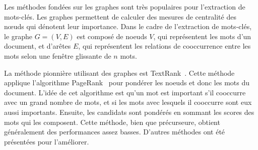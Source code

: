 Les méthodes fondées sur les graphes sont très populaires pour l'extraction de mots-clés. Les graphes permettent de calculer des mesures de centralité des n\oe{}uds qui dénotent leur importance.
Dans le cadre de l'extraction de mots-clés, le graphe $G=(V, E)$ est composé de noeuds $V$, qui représentent les mots d'un document, et d'arêtes $E$, qui représentent les relations de cooccurrence entre les mots selon une fenêtre glissante de $n$ mots.


La méthode pionnière utilisant des graphes est TextRank~\cite{mihalcea_textrank:_2004}.
Cette méthode applique l'algorithme PageRank~\cite{page_pagerank_1999} pour pondérer les noeuds et donc les mots du document.
L'idée de cet algorithme est qu'un mot est important s'il cooccurre avec un grand nombre de mots, et si les mots avec lesquels il cooccurre sont eux aussi importants.
Ensuite, les candidats sont pondérés en sommant les scores des mots qui les composent.
Cette méthode, bien que précurseure, obtient généralement des performances assez basses. D'autres méthodes ont été présentées pour l'améliorer.

%


